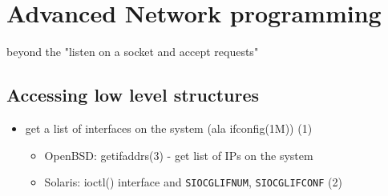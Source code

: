 
\section{Advanced Network programming}

beyond the "listen on a socket and accept requests"


\subsection{Accessing low level structures}

\begin{itemize}
  \item get a list of interfaces on the system (ala ifconfig(1M)) (1)
  \begin{itemize}
    \item OpenBSD: getifaddrs(3) - get list of IPs on the system
    \item Solaris: ioctl() interface and \texttt{SIOCGLIFNUM},
      \texttt{SIOCGLIFCONF} (2)
  \end{itemize}
\end{itemize}


